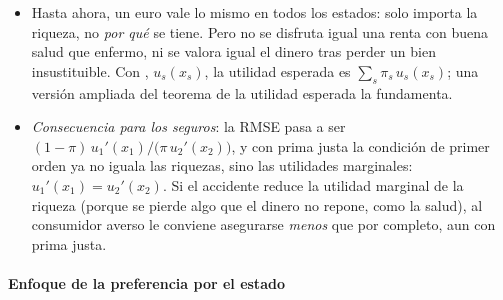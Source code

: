 \documentclass[11pt]{article}
\begin{document}
\begin{itemize}
\item Hasta ahora, un euro vale lo mismo en todos los estados: solo importa la riqueza, no \emph{por qué} se tiene. Pero no se disfruta igual una renta con buena salud que enfermo, ni se valora igual el dinero tras perder un bien insustituible. Con , $u_s(x_s)$, la utilidad esperada es $\sum_s\pi_s\,u_s(x_s)$; una versión ampliada del teorema de la utilidad esperada la fundamenta\nocite{Karni1985Decision}.
\item \emph{Consecuencia para los seguros}: la RMSE pasa a ser $(1-\pi)\,u_1'(x_1)/\big(\pi\,u_2'(x_2)\big)$, y con prima justa la condición de primer orden ya no iguala las riquezas, sino las utilidades marginales: $u_1'(x_1)=u_2'(x_2)$. Si el accidente reduce la utilidad marginal de la riqueza (porque se pierde algo que el dinero no repone, como la salud), al consumidor averso le conviene asegurarse \emph{menos} que por completo, aun con prima justa\nocite{CookGraham1977Demand}.
\end{itemize}

\paragraph{Enfoque de la preferencia por el estado}
\end{document}
